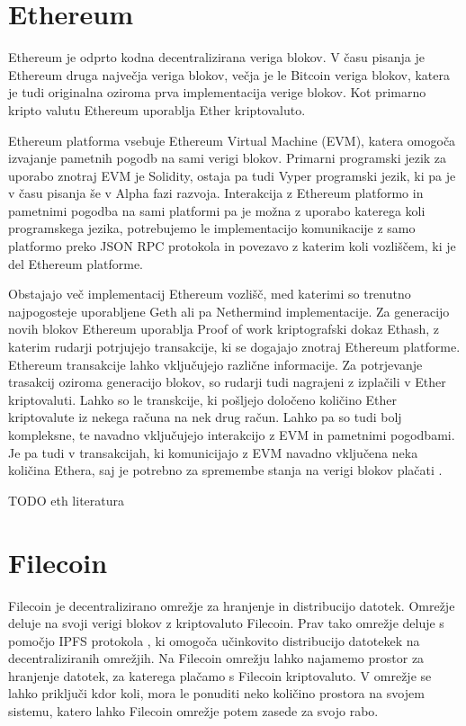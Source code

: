 \documentclass[a4paper,12pt,openright]{book}
\begin{document}
\section{Ethereum}
Ethereum je odprto kodna decentralizirana veriga blokov.
V času pisanja je Ethereum druga največja veriga blokov, večja je le Bitcoin veriga blokov, katera je tudi originalna oziroma prva implementacija verige blokov.
Kot primarno kripto valutu Ethereum uporablja Ether kriptovaluto.

Ethereum platforma vsebuje Ethereum Virtual Machine (EVM), katera omogoča izvajanje pametnih pogodb na sami verigi blokov.
Primarni programski jezik za uporabo znotraj EVM je Solidity, ostaja pa tudi Vyper programski jezik, ki pa je v času pisanja še v Alpha fazi razvoja.
Interakcija z Ethereum platformo in pametnimi pogodba na sami platformi pa je možna z uporabo katerega koli programskega jezika, potrebujemo le implementacijo komunikacije z samo platformo preko JSON RPC protokola in povezavo z katerim koli vozliščem, ki je del Ethereum platforme.

Obstajajo več implementacij Ethereum vozlišč, med katerimi so trenutno najpogosteje uporabljene Geth ali pa Nethermind implementacije.
Za generacijo novih blokov Ethereum uporablja Proof of work kriptografski dokaz Ethash, z katerim rudarji potrjujejo transakcije, ki se dogajajo znotraj Ethereum platforme. 
Ethereum transakcije lahko vključujejo različne informacije. 
Za potrjevanje trasakcij oziroma generacijo blokov, so rudarji tudi nagrajeni z izplačili v Ether kriptovaluti.
Lahko so le transkcije, ki pošljejo določeno količino Ether kriptovalute iz nekega računa na nek drug račun.
Lahko pa so tudi bolj kompleksne, te navadno vključujejo interakcijo z EVM in pametnimi pogodbami.
Je pa tudi v transakcijah, ki komunicijajo z EVM navadno vključena neka količina Ethera, saj je potrebno za spremembe stanja na verigi blokov plačati \cite{ethereum_whitepaper}.

TODO eth literatura

\section{Filecoin}
Filecoin je decentralizirano omrežje za hranjenje in distribucijo datotek.
Omrežje deluje na svoji verigi blokov z kriptovaluto Filecoin.
Prav tako omrežje deluje s pomočjo IPFS protokola \cite{IPFS}, ki omogoča učinkovito distribucijo datotekek na decentraliziranih omrežjih.
Na Filecoin omrežju lahko najamemo prostor za hranjenje datotek, za katerega plačamo s Filecoin kriptovaluto.
V omrežje se lahko priključi kdor koli, mora le ponuditi neko količino prostora na svojem sistemu, katero lahko Filecoin omrežje potem zasede za svojo rabo.
\end{document}

